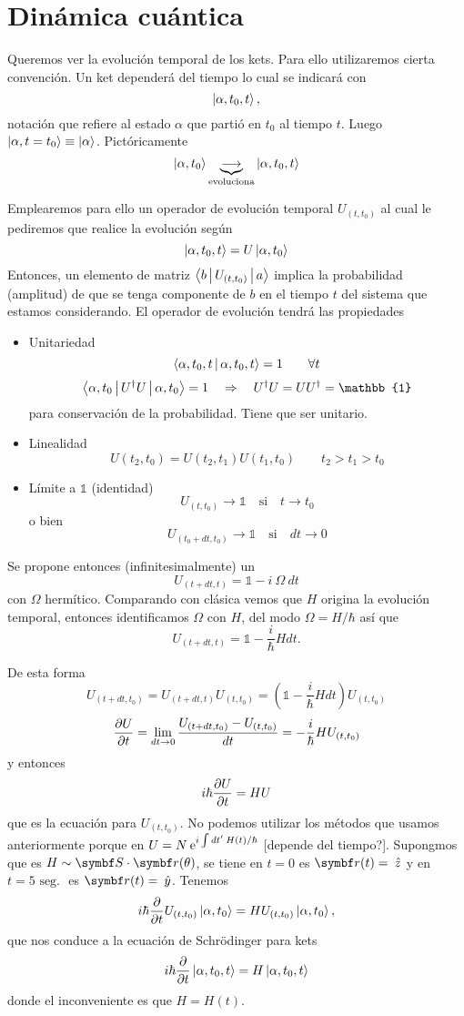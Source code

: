 \documentclass[10pt,oneside]{CBFT_book}
\begin{document}
\chapter{Dinámica cuántica}

Queremos ver la evolución temporal de los kets. Para ello utilizaremos cierta convención.
Un ket dependerá del tiempo lo cual se indicará con 
\[
	\Ket{\alpha,t_0,t},
\]
notación que refiere al estado $\alpha$ que partió en $t_0$ al tiempo $t$. 
Luego $\Ket{\alpha,t=t_0} \equiv \Ket{\alpha}$.
Pictóricamente
\[
	\Ket{\alpha,t_0} \underbrace{\longrightarrow}_{\text{evoluciona}} \Ket{\alpha,t_0,t}
\]

Emplearemos para ello un operador de evolución temporal $U_{(t,t_0)}$ al cual le pediremos
que realice la evolución según
\[
	\Ket{\alpha,t_0,t} = U \Ket{\alpha,t_0}
\]
Entonces, un elemento de matriz $\Braket{b|U_{(t,t_0)}|a}$ implica la probabilidad (amplitud)
de que se tenga componente de $b$ en el tiempo $t$ del sistema que estamos considerando.
El operador de evolución tendrá las propiedades

\begin{itemize}
 \item Unitariedad
 \[
	\Braket{ \alpha,t_0,t| \alpha,t_0,t} = 1 \qquad \forall t
 \]
 \[
	\Braket{ \alpha,t_0| U^\dagger U| \alpha,t_0} = 1 \quad \Rightarrow \quad 
	U^\dagger U = U U^\dagger = \mathbb{1}
 \]
 para conservación de la probabilidad. Tiene que ser unitario.
 \item Linealidad
 \[
	U(t_2,t_0) = U(t_2,t_1) U(t_1,t_0) \qquad t_2>t_1>t_0
 \]
 \item Límite a $\mathbb{1}$ (identidad)
 \[
	U_{(t,t_0)} \to \mathbb{1} \quad \text{si} \quad t\to t_0
 \]
 o bien 
 \[
	U_{(t_0+dt,t_0)} \to \mathbb{1} \quad \text{si} \quad dt\to 0
 \]
\end{itemize}

Se propone entonces (infinitesimalmente) un 
\[
	U_{(t+dt,t)} = \mathbb{1} - i \: \Omega \: dt 
\]
con $\Omega$ hermítico. Comparando con clásica vemos que $H$ origina la evolución temporal, entonces
identificamos $\Omega$ con $H$, del modo $\Omega = H/\hbar$ así que 
\[
	U_{(t+dt,t)} = \mathbb{1} - \frac{i}{\hbar} H dt .
\]

De esta forma 
\[
	U_{(t+dt,t_0)} =  U_{(t+dt,t)} U_{(t,t_0)}  = 
	\left( \mathbb{1} - \frac{i}{\hbar} H dt \right) U_{(t,t_0)}
\]
\[
	\frac{\partial^{\hspace{-0.05em}} {U}}{\partial {t}^{\hspace{-0.05em}}} = \lim_{dt\to 0} \frac{ U_{(t+dt,t_0)} - U_{(t,t_0)} }{dt} = 
	- \frac{i}{\hbar}H U_{(t,t_0)}
\]
y entonces 
\[
	i\hbar\frac{\partial^{\hspace{-0.05em}} {U}}{\partial {t}^{\hspace{-0.05em}}} = HU
\]
que es la ecuación para $U_{(t,t_0)}$.
No podemos utilizar los métodos que usamos anteriormente porque en
$U = N \:\mathrm{e}^{i \int dt' \:H(t)/\hbar }$ [depende del tiempo?].
Supongmos que es $ H \sim \vb S \cdot \vb r (\theta)$, se tiene en
$t=0$ es $\vb r(t) = \zver$ y en $t = 5 \text{ seg. } $ es $\vb r(t) = \yver$.
Tenemos
\[
	i\hbar\frac{\partial^{\hspace{-0.05em}} {}}{\partial {t}^{\hspace{-0.05em}}} U_{(t,t_0)} \Ket{\alpha,t_0} = H U_{(t,t_0)} \Ket{\alpha,t_0},
\]
que nos conduce a la ecuación de Schrödinger para kets
\[
	i\hbar\frac{\partial^{\hspace{-0.05em}} {}}{\partial {t}^{\hspace{-0.05em}}} \Ket{\alpha,t_0,t} = H \Ket{\alpha,t_0,t}
\]
donde el inconveniente es que $H=H(t)$.
\end{document}
